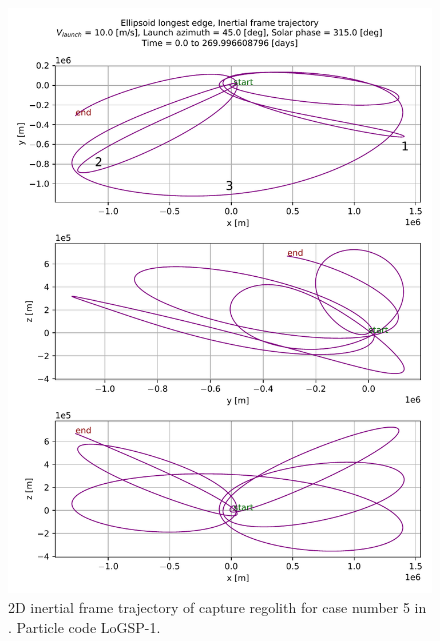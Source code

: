 \begin{figure}[htb]
\centering
\captionsetup{justification=centering}
\includegraphics[angle=90, width=\linewidth, height=\textheight, keepaspectratio=true]{longest_edge_perturbations/3.2Density_1cmSize/10ms_45Azimuth_315SolarPhase/2d_trajectory_inertialFrame_edit.pdf}
\caption{2D inertial frame trajectory of capture regolith for case number 5 in . Particle code LoGSP-1.}
\label{fig:LoGSP_1_capture_case_5_2d_traj_inertialFrame}
\end{figure}
\FloatBarrier
